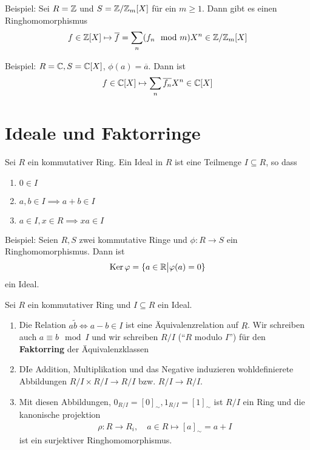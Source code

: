 Beispiel: \quad Sei $R = \mathbb{Z}$ und $S = \mathbb{Z}/\mathbb{Z}_m[X]$ für ein $m \geq 1$. Dann gibt es einen Ringhomomorphismus
\begin{align*}
				f \in \mathbb{Z}[X] \mapsto \overline{f} = \sum_n(f_n \mod m)X^n \in \mathbb{Z}/\mathbb{Z}_m[X]
\end{align*}


Beispiel: \quad $R = \mathbb{C}, S = \mathbb{C}[X]$, $\phi(a) = \overline{a}$. Dann ist
\begin{align*}
				f \in \mathbb{C}[X] \mapsto \sum_n \overline{f_n}X^n \in \mathbb{C}[X]
\end{align*}



\section{Ideale und Faktorringe}
\begin{definition}[Ideal]
Sei $R$ ein kommutativer Ring. Ein Ideal in $R$ ist eine Teilmenge $I \subseteq R$, so dass
\begin{enumerate}
\item $0 \in I$
\item $a,b \in I \implies a + b \in I$
\item $a \in I, x \in R \implies xa \in I$
\end{enumerate}
\end{definition}


Beispiel: \quad Seien $R, S$ zwei kommutative Ringe und $\phi: R \to S$ ein Ringhomomorphismus. Dann ist
\begin{align*}
				\operatorname{Ker} \varphi = \{a \in \mathbb{R} \big\vert \varphi(a) = 0\}
\end{align*}
ein Ideal.

\begin{satz}[Faktorring]
Sei $R$ ein kommutativer Ring und $I \subseteq R$ ein Ideal.
\begin{enumerate}
\item Die Relation $a \tilde b \Leftrightarrow a - b \in I$ ist eine Äquivalenzrelation auf $R$. Wir schreiben auch $a \equiv b \mod I$ und wir schreiben $R/I$ (``$R$ modulo $I$'') für den \textbf{Faktorring} der Äquivalenzklassen
\item DIe Addition, Multiplikation und das Negative induzieren wohldefinierete Abbildungen $R/I \times R/I \to R/I$ bzw. $R/I \to R/I$.
\item Mit diesen Abbildungen, $0_{R/I} = [0]_{\sim}, 1_{R/I} = [1]_{\sim}$ ist $R/I$ ein Ring und die kanonische projektion
\begin{align*}
				\rho: R \to R_i, \quad a \in R \mapsto [a]_{\sim} = a + I
\end{align*}
ist ein surjektiver Ringhomomorphismus.
\end{enumerate}
\end{satz}



